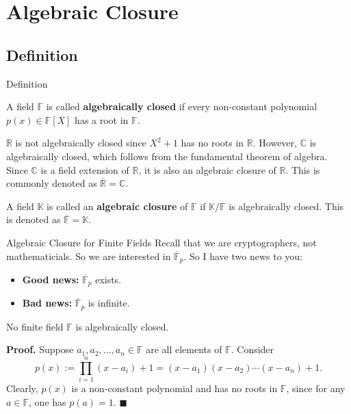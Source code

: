 \documentclass{zkdl-presentation-template}
\begin{document}
    \section{Algebraic Closure}
    \subsection{Definition}

    \begin{frame}{Definition}
        \begin{definition}
            A field $\mathbb{F}$ is called \textbf{algebraically closed} if every non-constant polynomial $p(x) \in \mathbb{F}[X]$ has a root in $\mathbb{F}$.
        \end{definition}
        
        \begin{example}
            $\mathbb{R}$ is not algebraically closed since $X^2+1$ has no roots in $\mathbb{R}$. However, $\mathbb{C}$ is algebraically closed, which follows from the fundamental theorem of algebra. Since $\mathbb{C}$ is a field extension of $\mathbb{R}$, it is also an algebraic closure of $\mathbb{R}$. This is commonly denoted as $\overline{\mathbb{R}} = \mathbb{C}$.
        \end{example}

        \begin{definition}
            A field $\mathbb{K}$ is called an \textbf{algebraic closure} of $\mathbb{F}$ if $\mathbb{K}/\mathbb{F}$ is algebraically closed. This is denoted as $\overline{\mathbb{F}} = \mathbb{K}$.
        \end{definition}
    \end{frame}

    \begin{frame}{Algebraic Closure for Finite Fields}
        Recall that we are cryptographers, not mathematicials. So we are interested in $\overline{\mathbb{F}}_p$. So I have two news to you:
        \begin{itemize}
            \item \textcolor{oc-green-7}{\textbf{Good news:}} $\overline{\mathbb{F}}_p$ exists.
            \item \textcolor{oc-red-7}{\textbf{Bad news:}} $\overline{\mathbb{F}}_p$ is infinite.
        \end{itemize}

        \begin{theorem}
            No finite field $\mathbb{F}$ is algebraically closed.
        \end{theorem}
        
        \textbf{Proof.} Suppose $a_1,a_2,\dots,a_n \in \mathbb{F}$ are all elements of $\mathbb{F}$. Consider
        \begin{equation*}
            p(x) := \prod_{i=1}^n (x-a_i)+1 = (x-a_1)(x-a_2)\cdots(x-a_n)+1.
        \end{equation*}
        Clearly, $p(x)$ is a non-constant polynomial and has no roots in $\mathbb{F}$, since for any $a \in \mathbb{F}$, one has $p(a)=1$. $\blacksquare$
    \end{frame}
\end{document}
